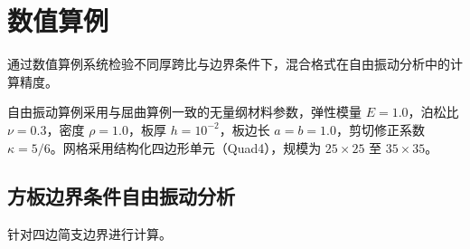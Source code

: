
\section{数值算例}

通过数值算例系统检验不同厚跨比与边界条件下，混合格式在自由振动分析中的计算精度。

自由振动算例采用与屈曲算例一致的无量纲材料参数，弹性模量 $E=1.0$，泊松比 $\nu=0.3$，密度 $\rho=1.0$，板厚 $h=10^{-2}$，板边长 $a=b=1.0$，剪切修正系数 $\kappa=5/6$。网格采用结构化四边形单元（Quad4），规模为 $25\times25$ 至 $35\times35$。

\subsection{方板边界条件自由振动分析}


针对四边简支边界进行计算。


